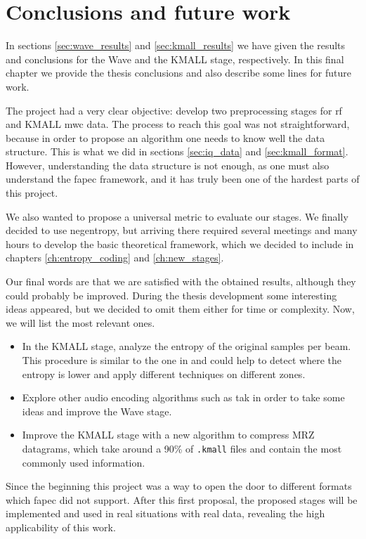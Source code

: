 \chapter{Conclusions and future work}
In sections \ref{sec:wave_results} and \ref{sec:kmall_results} we have given the results and conclusions for the Wave and the KMALL stage, respectively. In this final chapter we provide the thesis conclusions and also describe some lines for future work.

The project had a very clear objective: develop two preprocessing stages for \acrfull{rf} and KMALL \acrshort{mwc} data. The process to reach this goal was not straightforward, because in order to propose an algorithm one needs to know well the data structure. This is what we did in sections \ref{sec:iq_data} and \ref{sec:kmall_format}. However, understanding the data structure is not enough, as one must also understand the \acrshort{fapec} framework, and it has truly been one of the hardest parts of this project.

We also wanted to propose a universal metric to evaluate our stages. We finally decided to use negentropy, but arriving there required several meetings and many hours to develop the basic theoretical framework, which we decided to include in chapters \ref{ch:entropy_coding} and \ref{ch:new_stages}.

Our final words are that we are satisfied with the obtained results, although they could probably be improved. During the thesis development some interesting ideas appeared, but we decided to omit them either for time or complexity. Now, we will list the most relevant ones.
\begin{itemize}
	\item In the KMALL stage, analyze the entropy of the original samples per beam. This procedure is similar to the one in \parencite{MBESComp} and could help to detect where the entropy is lower and apply different techniques on different zones.
	\item Explore other audio encoding algorithms such as \acrshort{tak} in order to take some ideas and improve the Wave stage.
	\item Improve the KMALL stage with a new algorithm to compress MRZ datagrams, which take around a 90\% of \texttt{.kmall} files and contain the most commonly used information.
\end{itemize}

Since the beginning this project was a way to open the door to different formats which \acrshort{fapec} did not support. After this first proposal, the proposed stages will be implemented and used in real situations with real data, revealing the high applicability of this work.
